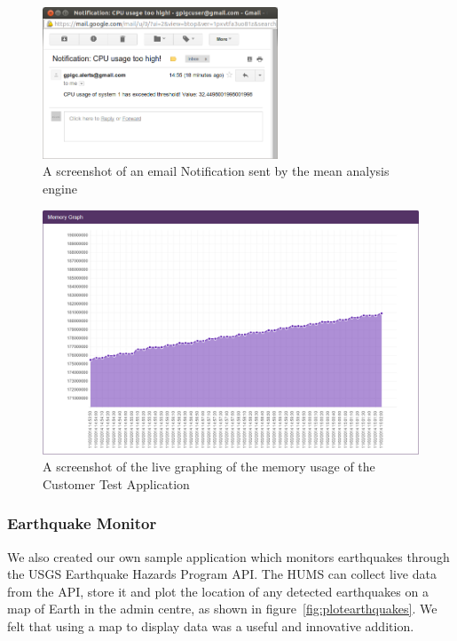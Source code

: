 \documentclass[10pt,a4paper]{article}
\begin{document}
\begin{figure}[h!]
  \centering
  \includegraphics[width=7cm]{images/TestApplicationCPUAlert.png}
  \caption{A screenshot of an email Notification sent by the mean analysis engine}
  \label{fig:alerting}
\end{figure}


\begin{figure}[htbp!]
  \centering
  \includegraphics[width=12cm]{images/TestApplicationMemoryGraph.png}
  \caption{A screenshot of the live graphing of the memory usage of the Customer 
  Test Application}
  \label{fig:graphing}
\end{figure}

\subsubsection{Earthquake Monitor}
We also created our own sample application which monitors earthquakes 
through the USGS Earthquake Hazards Program API. The HUMS
can collect live data from the API, store it and plot the location of any
detected earthquakes on a map of Earth in the admin centre, as shown
in figure~\ref{fig:plotearthquakes}. We felt that using a map to display
data was a useful and innovative addition.
\end{document}
